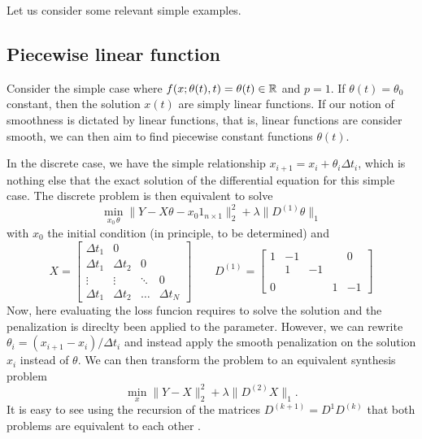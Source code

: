 \label{section:examples}

Let us consider some relevant simple examples. 

\subsection{Piecewise linear function}

Consider the simple case where $f(x; \theta(t), t) = \theta(t) \in \operatorname{\mathbb{R}}$ and $p=1$.
If $\theta(t) = \theta_0$ constant, then the solution $x(t)$ are simply linear functions. 
If our notion of smoothness is dictated by linear functions, that is, linear functions are consider smooth, we can then aim to find piecewise constant functions $\theta(t)$.

In the discrete case, we have the simple relationship $x_{i+1} = x_i + \theta_i \Delta t_i$, which is nothing else that the exact solution of the differential equation for this simple case. 
The discrete problem is then equivalent to solve 
\begin{equation}
    \min_{x_0 \, \theta}
    \| Y - X\theta - x_0 1_{n \times 1} \|_2^2
    + 
    \lambda
    \| D^{(1)}\theta \|_1
\end{equation}
with $x_0$ the initial condition (in principle, to be determined) and 
\begin{equation}
    X 
    = 
    \begin{bmatrix}
        \Delta t_1 & 0 &  &  \\
        \Delta t_1 & \Delta t_2 & 0 &  \\
        \vdots & \vdots & \ddots & 0 \\
        \Delta t_1 & \Delta t_2 & \dots & \Delta t_N
    \end{bmatrix}
    \qquad 
    D^{(1)}
    = 
    \begin{bmatrix}
        1 & -1 &  &  & 0 \\
         & 1 & -1 &  &  \\
         &  &  &  &  \\
        0 &  &  & 1 & -1
    \end{bmatrix}
\end{equation}
Now, here evaluating the loss funcion requires to solve the solution and the penalization is direclty been applied to the parameter. 
However, we can rewrite $\theta_i = (x_{i+1}-x_i)/\Delta t_i$ and instead apply the smooth penalization on the solution $x_i$ instead of $\theta$. 
We can then transform the problem to an equivalent synthesis problem \cite{synthesis-analysis}
\begin{equation}
    \min_x 
    \| Y - X \|_2^2
    + \lambda
    \| D^{(2)} X \|_1    .
\end{equation}
It is easy to see using the recursion of the matrices $D^{(k+1)} = D^{1} D^{(k)}$ that both problems are equivalent to each other \cite{tibs-trend-filter}. 

